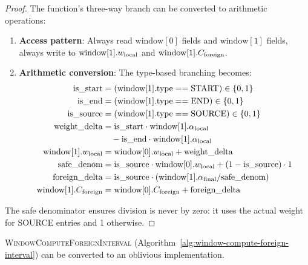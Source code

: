 \begin{proof}
The function's three-way branch can be converted to arithmetic operations:
\begin{enumerate}
\item \textbf{Access pattern}: Always read $\text{window}[0]$ fields and $\text{window}[1]$ fields, always write to $\text{window}[1].w_{\text{local}}$ and $\text{window}[1].C_{\text{foreign}}$.
\item \textbf{Arithmetic conversion}: The type-based branching becomes:
\begin{align}
\text{is\_start} &= (\text{window}[1].\text{type} == \text{START}) \in \{0,1\} \nonumber \\
\text{is\_end} &= (\text{window}[1].\text{type} == \text{END}) \in \{0,1\} \nonumber \\
\text{is\_source} &= (\text{window}[1].\text{type} == \text{SOURCE}) \in \{0,1\} \nonumber \\
\text{weight\_delta} &= \text{is\_start} \cdot \text{window}[1].\alpha_{\text{local}} \nonumber \\
&\quad - \text{is\_end} \cdot \text{window}[1].\alpha_{\text{local}} \nonumber \\
\text{window}[1].w_{\text{local}} &= \text{window}[0].w_{\text{local}} + \text{weight\_delta} \nonumber \\
\text{safe\_denom} &= \text{is\_source} \cdot \text{window}[0].w_{\text{local}} + (1 - \text{is\_source}) \cdot 1 \nonumber \\
\text{foreign\_delta} &= \text{is\_source} \cdot (\text{window}[1].\alpha_{\text{final}} / \text{safe\_denom}) \nonumber \\
\text{window}[1].C_{\text{foreign}} &= \text{window}[0].C_{\text{foreign}} + \text{foreign\_delta} \nonumber
\end{align}
\end{enumerate}
The safe denominator ensures division is never by zero: it uses the actual weight for SOURCE entries and 1 otherwise.
\end{proof}

\begin{lemma}
\label{lem:window-foreign-interval}
\textsc{WindowComputeForeignInterval} (Algorithm~\ref{alg:window-compute-foreign-interval}) can be converted to an oblivious implementation.
\end{lemma}

